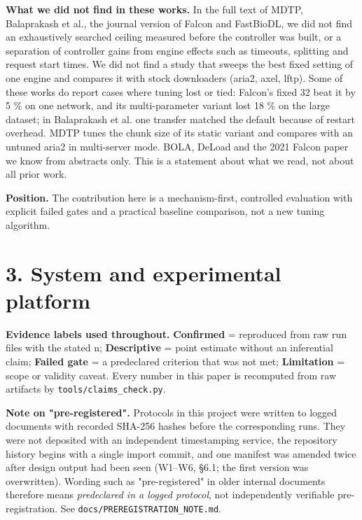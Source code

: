 \documentclass{ieeeaccess}
\begin{document}
\textbf{What we did not find in these works.} In the full text of MDTP, Balaprakash et al., the journal version of Falcon and FastBioDL, we did not find an exhaustively searched ceiling measured before the controller was built, or a separation of controller gains from engine effects such as timeouts, splitting and request start times. We did not find a study that sweeps the best fixed setting of one engine and compares it with stock downloaders (aria2, axel, lftp). Some of these works do report cases where tuning lost or tied: Falcon's fixed 32 beat it by 5 \% on one network, and its multi-parameter variant lost 18 \% on the large dataset; in Balaprakash et al. one transfer matched the default because of restart overhead. MDTP tunes the chunk size of its static variant and compares with an untuned aria2 in multi-server mode. BOLA, DeLoad and the 2021 Falcon paper we know from abstracts only. This is a statement about what we read, not about all prior work.


\textbf{Position.} The contribution here is a mechanism-first, controlled evaluation with explicit failed gates and a practical baseline comparison, not a new tuning algorithm.


\section*{3. System and experimental platform}



\textbf{Evidence labels used throughout.} \textbf{Confirmed} = reproduced from raw run files with the stated n; \textbf{Descriptive} = point estimate without an inferential claim; \textbf{Failed gate} = a predeclared criterion that was not met; \textbf{Limitation} = scope or validity caveat. Every number in this paper is recomputed from raw artifacts by \texttt{tools/\allowbreak{}claims\_check.py}.


\textbf{Note on "pre-registered".} Protocols in this project were written to logged documents with recorded SHA-256 hashes before the corresponding runs. They were not deposited with an independent timestamping service, the repository history begins with a single import commit, and one manifest was amended twice after design output had been seen (W1–W6, §6.1; the first version was overwritten). Wording such as "pre-registered" in older internal documents therefore means \emph{predeclared in a logged protocol}, not independently verifiable pre-registration. See \texttt{docs/\allowbreak{}PREREGISTRATION\_NOTE.md}.
\end{document}
